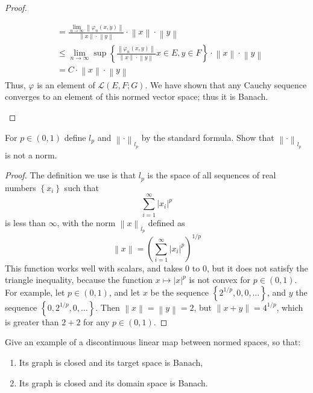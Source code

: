 \documentclass[12pt]{article}
\theoremstyle{definition}
\newenvironment{problem}[2][Problem]{\begin{trivlist}
\item[\hskip \labelsep {\bfseries #1}\hskip \labelsep {\bfseries #2.}]}{\end{trivlist}}
\begin{document}
\begin{proof}
\begin{enumerate}[label=(\roman*)]
\begin{align*}
				&= \frac{\lim_{n \to \infty} \left \lVert { \varphi_n(x,y) } \right \lVert }{\left \lVert { x } \right \lVert \cdot \left \lVert { y } \right \lVert }\cdot \left \lVert { x } \right \lVert \cdot \left \lVert {  y } \right \lVert \\
				&\leq \lim_{n \to \infty} \sup\left\{  { \frac{\left \lVert\varphi_n(x,y)\right\rVert}{\left \lVert { x  } \right \lVert \cdot \left \lVert { y } \right \lVert } } x \in E, y \in F \right\} \cdot \left \lVert {  x } \right \lVert \cdot \left \lVert { y } \right \lVert \\
				&= C \cdot \left \lVert { x } \right \lVert \cdot \left \lVert { y } \right \lVert 
			\end{align*}
			Thus, $\varphi$ is an element of $\mathcal L(E,F;G)$. We have shown that any Cauchy sequence converges to an element of this normed vector space; thus it is Banach.
	\end{enumerate}
\end{proof}
\begin{problem}{4}
	For $p \in (0,1)$ define $l_p$ and $\left \lVert { \cdot } \right \lVert _{l_p}$ by the standard formula. Show that $\left \lVert { \cdot } \right \lVert _{l_p}$ is not a norm.
\end{problem}
\begin{proof}
	The definition we use is that $l_p$ is the space of all sequences of real numbers $\left\{ x_i \right\}$ such that 
	\[\sum_{i = 1}^\infty \lvert x_i\rvert^{p}\]
	is less than $\infty$, with the norm $\left \lVert { x } \right \lVert _{l_p}$ defined as
	\[\left \lVert { x } \right \lVert = \left( \sum_{i=1}^\infty \left \lvert { x_i } \right \lvert ^{p}\right)^{1/p}\]
	This function works well with scalars, and takes $0$ to $0$, but it does not satisfy the triangle inequality, because the function $x \mapsto \left \lvert { x } \right \lvert ^p$ is not convex for $p \in (0,1)$. For example, let $p \in (0,1)$, and let $x$ be the sequence $\left\{ 2^{1/p}, 0, 0,\dots \right\}$, and $y$ the sequence $\left\{ 0, 2^{1/p}, 0,\dots \right\}$. Then $\left \lVert { x } \right \lVert  = \left \lVert { y } \right \lVert  = 2$, but $\left \lVert { x+y } \right \lVert = 4^{1/p}$, which is greater than $2+2$ for any $p \in (0,1)$.
\end{proof}
\begin{problem}{5}
	Give an example of a discontinuous linear map between normed spaces, so that:
	\begin{enumerate}[label=(\roman*)]
		\item Its graph is closed and its target space is Banach,
		\item Its graph is closed and its domain space is Banach.
	\end{enumerate}
\end{problem}
\end{document}

